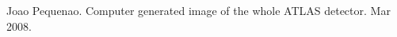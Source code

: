 \begin{thebibliography}{24}
Joao Pequenao. Computer generated image of the whole ATLAS detector. Mar 2008.
\end{thebibliography}
